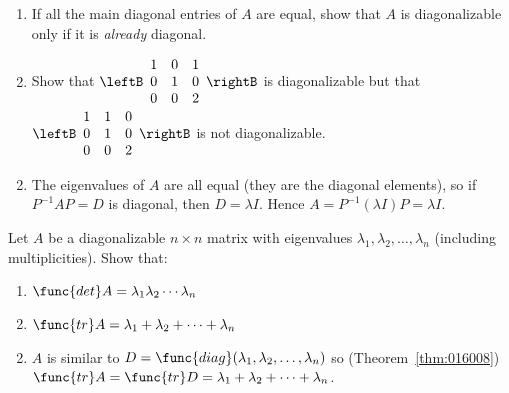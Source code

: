 \begin{multicols}{2}
\begin{ex}
\begin{enumerate}[label={\alph*.}]
\item If all the main diagonal entries of $A$ are equal, show that $A$ is diagonalizable only if it is \textit{already} diagonal.

\item Show that $\leftB \begin{array}{rrr}
1 & 0 & 1 \\
0 & 1 & 0 \\
0 & 0 & 2
\end{array} \rightB$ is diagonalizable but that $
 \leftB \begin{array}{rrr}
 1 & 1 & 0 \\
 0 & 1 & 0 \\
 0 & 0 & 2
 \end{array} \rightB$ is not diagonalizable.

\end{enumerate}
\begin{sol}
\begin{enumerate}[label={\alph*.}]
\setcounter{enumi}{1}
\item  The eigenvalues of $A$ are all equal (they are the diagonal elements), so if $P^{-1}AP = D$ is diagonal, then $D = \lambda I$. Hence $A = P^{-1}(\lambda I)P = \lambda I$.

\end{enumerate}
\end{sol}
\end{ex}



\begin{ex}
Let $A$ be a diagonalizable $n \times n$ matrix with eigenvalues $\lambda_{1}, \lambda_{2}, \dots, \lambda_{n}$ (including multiplicities). Show that:

\begin{enumerate}[label={\alph*.}]
\item $\func{det} A = \lambda_{1}\lambda_{2}\cdots \lambda_{n}$

\item $\func{tr} A = \lambda_{1} + \lambda_{2} + \cdots + \lambda_{n}$

\end{enumerate}
\begin{sol}
\begin{enumerate}[label={\alph*.}]
\setcounter{enumi}{1}
\item  $A$ is similar to $D = \func{diag}(\lambda_{1}, \lambda_{2}, \dots, \lambda_{n})$ so (Theorem~\ref{thm:016008}) $\func{tr} A = \func{tr} D = \lambda_{1} + \lambda_{2} + \dots + \lambda_{n}$.


\end{enumerate}
\end{sol}
\end{ex}
\end{multicols}
